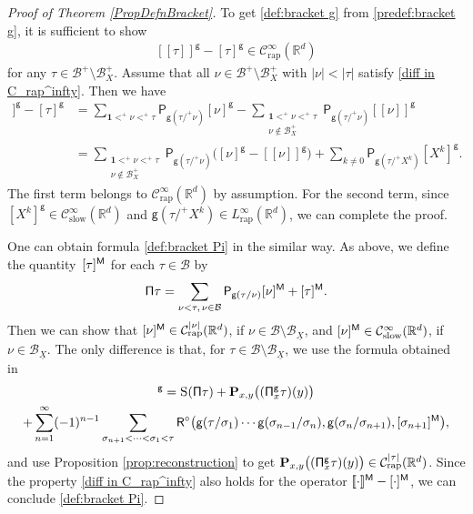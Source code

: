 \documentclass[10pt]{amsart}
\theoremstyle{plain}
\theoremstyle{definition}
\newcommand{\unit}{\mathbf{1}}
\newcommand{\Brac}[1]{[\![#1]\!]}
\newcommand{\rap}{\mathrm{rap}}
\newcommand{\slow}{\mathrm{slow}}
\newcommand{\bfP}{\mathbf{P}}
\newcommand{\sfP}{\mathsf{P}}
\newcommand{\sfR}{\mathsf{R}}
\newcommand{\sfg}{\mathsf{g}}
\newcommand{\bbR}{\mathbb{R}}
\newcommand{\mcB}{\mathcal{B}}
\newcommand{\mcC}{\mathcal{C}}
\begin{document}
\begin{proof}[Proof of Theorem \ref{PropDefnBracket}]
To get \eqref{def:bracket g} from \eqref{predef:bracket g}, it is sufficient to show
\begin{align}\label{diff in C_rap^infty}
\Brac{\tau}^\sfg-[\tau]^\sfg\in \mcC_\rap^\infty(\bbR^d)
\end{align}
for any $\tau\in\mcB^+\setminus\mcB_X^+$. Assume that all $\nu\in\mcB^+\setminus\mcB_X^+$ with $|\nu|<|\tau|$ satisfy \eqref{diff in C_rap^infty}. Then we have
\begin{align*}
\Brac{\tau}^\sfg-[\tau]^\sfg &= \sum_{\unit<^+\nu<^+\tau}\sfP_{\sfg(\tau/^+\nu)}[\nu]^\sfg-\sum_{\substack{\unit<^+\nu<^+\tau\\\nu\notin\mcB_X^+}}\sfP_{\sfg(\tau/^+\nu)}\Brac{\nu}^\sfg \\
&= \sum_{\substack{\unit<^+\nu<^+\tau\\\nu\notin\mcB_X^+}}\sfP_{\sfg(\tau/^+\nu)}\bigl([\nu]^\sfg-\Brac{\nu}^\sfg\bigr) + \sum_{k\neq0}\sfP_{\sfg(\tau/^+X^k)}[X^k]^\sfg.
\end{align*}
The first term belongs to $\mcC_\rap^\infty(\bbR^d)$ by assumption. For the second term, since $[X^k]^\sfg\in \mcC_\slow^\infty(\bbR^d)$ and $\sfg(\tau/^+X^k)\in L_\rap^\infty(\bbR^d)$, we can complete the proof.

One can obtain formula \eqref{def:bracket Pi} in the similar way. As above, we define the quantity~$[\tau]^{\sf M}$ for each $\tau\in\mcB$ by
\begin{align*}
{\sf\Pi}\tau=\sum_{\nu<\tau,\, \nu\in\mcB}\sfP_{\sfg(\tau/\nu)}[\nu]^{\sf M}+[\tau]^{\sf M}.
\end{align*}
Then we can show that $[\nu]^{\sf M}\in \mcC_\rap^{|\nu|}(\bbR^d)$, if $\nu\in\mcB\setminus\mcB_{\underline{X}}$, and $[\nu]^{\sf M}\in \mcC_\slow^\infty(\bbR^d)$, if $\nu\in\mcB_{\underline{X}}$.
The only difference is that, for $\tau\in\mcB\setminus\mcB_{\underline{X}}$, we use the formula obtained in~\cite{BH}
\begin{multline*}
[\tau]^\sfg = \textsc{S}({\sf\Pi}\tau)+\bfP_{x,y}\bigl(({\sf\Pi}_x^{\sfg}\tau)(y)\bigr) \\
+ \sum_{n=1}^\infty(-1)^{n-1}\sum_{\sigma_{n+1}<\cdots<\sigma_1<\tau} {\sfR}^\circ\bigl(\sfg(\tau/\sigma_1)\cdots\sfg(\sigma_{n-1}/\sigma_n),\sfg(\sigma_n/\sigma_{n+1}),[\sigma_{n+1}]^{\sf M}\bigr),
\end{multline*}
and use Proposition \ref{prop:reconstruction} to get $\bfP_{x,y}\bigl(({\sf\Pi}_x^{\sf g}\tau)(y)\bigr)\in \mcC_\rap^{|\tau|}(\bbR^d)$.
Since the property \eqref{diff in C_rap^infty} also holds for the operator $\Brac{\cdot}^{\sf M}-[\cdot]^{\sf M}$, we can conclude \eqref{def:bracket Pi}.
\end{proof}
\end{document}
